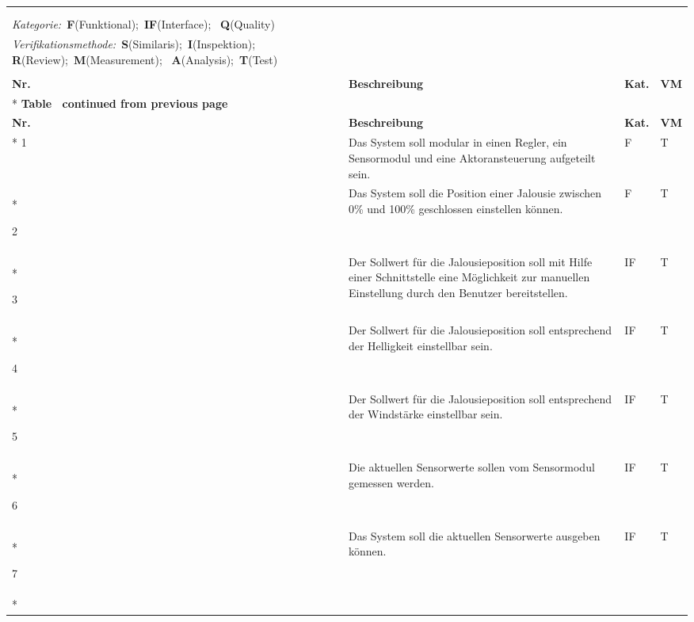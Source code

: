 \begin{longtable}[ht]{p{}  p{} p{} p{}}
	\captionabove[Requirements des Systems]{Requirements des Systems}\\
	\label{tab:requirements}\\
	\textit{Kategorie:}~\textbf{F}(Funktional);~\textbf{IF}(Interface);~
	\textbf{Q}(Quality)\\
	\textit{Verifikationsmethode:}~\textbf{S}(Similaris);~\textbf{I}(Inspektion);~
	\textbf{R}(Review);~\textbf{M}(Measurement);~
	\textbf{A}(Analysis);~\textbf{T}(Test)\\ 
	\\
	\toprule
	\rowcolor[HTML]{FFFC9E} 
	{\color[HTML]{333333} \textbf{Nr.}} & {\color[HTML]{333333} \textbf{Beschreibung}}  & {\color[HTML]{333333} \textbf{Kat.}} & {\color[HTML]{333333} \textbf{VM}} \\* \midrule
	\endfirsthead
	\multicolumn{4}{c}%
	{{\bfseries Table \thetable\ continued from previous page}} \\
	\toprule
	\rowcolor[HTML]{FFFC9E} 
	{\color[HTML]{333333} \textbf{Nr.}} & {\color[HTML]{333333} \textbf{Beschreibung}}  & {\color[HTML]{333333} \textbf{Kat.}} & {\color[HTML]{333333} \textbf{VM}} \\* \midrule
	\endhead
	1 & Das System soll modular in einen Regler, ein Sensormodul und eine Aktoransteuerung aufgeteilt sein. & F & T \\* \midrule
	
	2 & Das System soll die Position einer Jalousie zwischen 0\% und 100\% geschlossen einstellen können. & F & T \\* \midrule
	
	3 & Der Sollwert für die Jalousieposition soll mit Hilfe einer Schnittstelle eine Möglichkeit zur manuellen Einstellung durch den Benutzer bereitstellen. & IF & T \\* \midrule
	
	4 & Der Sollwert für die Jalousieposition soll entsprechend der Helligkeit einstellbar sein. & IF& T \\* \midrule
	
	5 & Der Sollwert für die Jalousieposition soll entsprechend der Windstärke einstellbar sein. & IF& T \\* \midrule
	
	6 & Die aktuellen Sensorwerte sollen vom Sensormodul gemessen werden. & IF& T \\* \midrule
	
	7 & Das System soll die aktuellen Sensorwerte ausgeben können. & IF & T \\* \midrule
	

\end{longtable}
